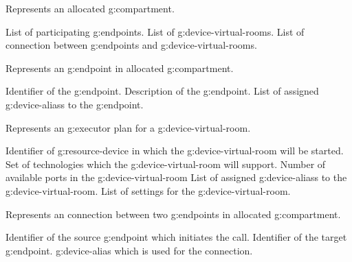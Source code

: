 \begin{Api}
Represents an allocated \gls{g:compartment}.
\begin{ApiClassAttributes}
 List of participating \glspl{g:endpoint}.
 List of \glspl{g:device-virtual-room}.
 List of connection between \glspl{g:endpoint} and \glspl{g:device-virtual-room}.
\end{ApiClassAttributes}

Represents an \gls{g:endpoint} in allocated \gls{g:compartment}.
\begin{ApiClassAttributes}
 Identifier of the \gls{g:endpoint}.
 Description of the \gls{g:endpoint}.
 List of assigned \glspl{g:device-alias} to the \gls{g:endpoint}.
\end{ApiClassAttributes}

Represents an \gls{g:executor} plan for a \gls{g:device-virtual-room}.
\begin{ApiClassAttributes}
 Identifier of \gls{g:resource-device} in which the \gls{g:device-virtual-room} will be started.
 Set of technologies which the \gls{g:device-virtual-room} will support.
 Number of available ports in the \gls{g:device-virtual-room}
 List of assigned \glspl{g:device-alias} to the \gls{g:device-virtual-room}.
 List of settings for the \gls{g:device-virtual-room}.
\end{ApiClassAttributes}

Represents an connection between two \glspl{g:endpoint} in allocated \gls{g:compartment}.
\begin{ApiClassAttributes}
 Identifier of the source \gls{g:endpoint} which initiates the call.
 Identifier of the target \gls{g:endpoint}.
 \Gls{g:device-alias} which is used for the connection.
\end{ApiClassAttributes}


\end{Api}
